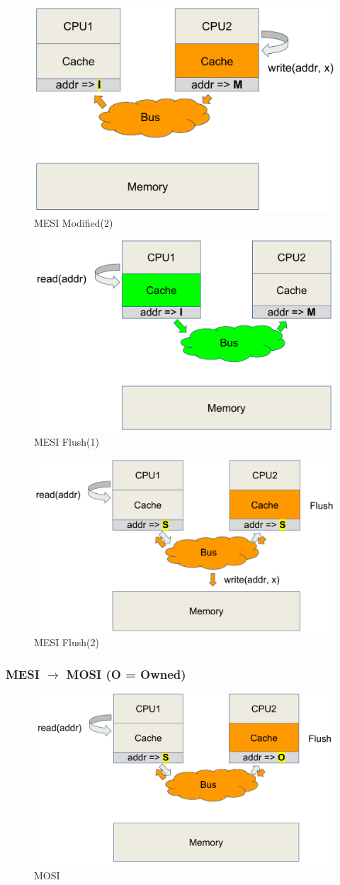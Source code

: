 \documentclass[10pt,a4paper,oneside,titlepage]{article}
\theoremstyle{plain}
\theoremstyle{defenition}
\begin{document}
\begin{figure}[h!]
	\centering
	\includegraphics[width=0.4\linewidth]{pictures/MESI13}
	\caption{MESI Modified(2)}
	\label{fig:mesi13}
\end{figure}

\begin{figure}[h!]
	\centering
	\includegraphics[width=0.4\linewidth]{pictures/MESI14}
	\caption{MESI Flush(1)}
	\label{fig:mesi14}
\end{figure}

\begin{figure}[h!]
	\centering
	\includegraphics[width=0.4\linewidth]{pictures/MESI15}
	\caption{MESI Flush(2)}
	\label{fig:mesi15}
\end{figure}

\subsubsection[MOSI]{MESI $\to$ MOSI (O = Owned)}

\begin{figure}[h!]
	\centering
	\includegraphics[width=0.4\linewidth]{pictures/MOSI}
	\caption{MOSI}
	\label{fig:mosi}
\end{figure}
\end{document}
